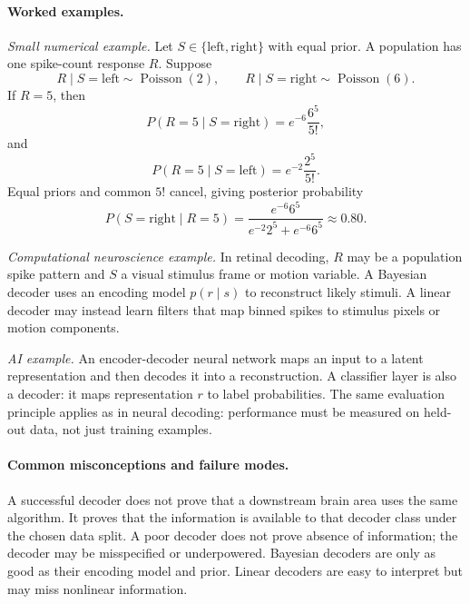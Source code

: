 \paragraph{Worked examples.}
\emph{Small numerical example.}
Let \(S\in\{\mathrm{left},\mathrm{right}\}\) with equal prior. A population has one spike-count response \(R\). Suppose
\[
R\mid S=\mathrm{left}\sim\operatorname{Poisson}(2),
\qquad
R\mid S=\mathrm{right}\sim\operatorname{Poisson}(6).
\]
If \(R=5\), then
\[
P(R=5\mid S=\mathrm{right})=e^{-6}\frac{6^5}{5!},
\]
and
\[
P(R=5\mid S=\mathrm{left})=e^{-2}\frac{2^5}{5!}.
\]
Equal priors and common \(5!\) cancel, giving posterior probability
\[
P(S=\mathrm{right}\mid R=5)
=\frac{e^{-6}6^5}{e^{-2}2^5+e^{-6}6^5}
\approx 0.80.
\]

\emph{Computational neuroscience example.}
In retinal decoding, \(R\) may be a population spike pattern and \(S\) a visual stimulus frame or motion variable. A Bayesian decoder uses an encoding model \(p(r\mid s)\) to reconstruct likely stimuli. A linear decoder may instead learn filters that map binned spikes to stimulus pixels or motion components.

\emph{AI example.}
An encoder-decoder neural network maps an input to a latent representation and then decodes it into a reconstruction. A classifier layer is also a decoder: it maps representation \(r\) to label probabilities. The same evaluation principle applies as in neural decoding: performance must be measured on held-out data, not just training examples.

\paragraph{Common misconceptions and failure modes.}
A successful decoder does not prove that a downstream brain area uses the same algorithm. It proves that the information is available to that decoder class under the chosen data split. A poor decoder does not prove absence of information; the decoder may be misspecified or underpowered. Bayesian decoders are only as good as their encoding model and prior. Linear decoders are easy to interpret but may miss nonlinear information.

